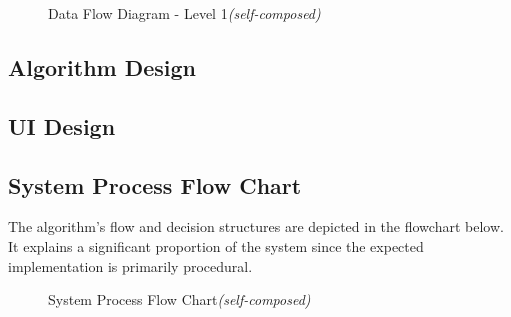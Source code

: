 \begin{figure}[h!]
\centering
\setlength{\fboxsep}{10pt}%
\setlength{\fboxrule}{0.5pt}%
\caption{Data Flow Diagram - Level 1\textit{(self-composed)}}
\label{fig:data-flow-diagram-l1}
\end{figure}


\subsection{Algorithm Design}


\subsection{UI Design}

\pagebreak
\subsection{System Process Flow Chart}
The algorithm's flow and decision structures are depicted in the flowchart below. It explains a significant proportion of the system since the expected implementation is primarily procedural.

\begin{figure}[h!]
\centering
\setlength{\fboxsep}{10pt}%
\setlength{\fboxrule}{0.5pt}%
\caption{System Process Flow Chart\textit{(self-composed)}}
\label{fig:system-process-flowchart}
\end{figure}

